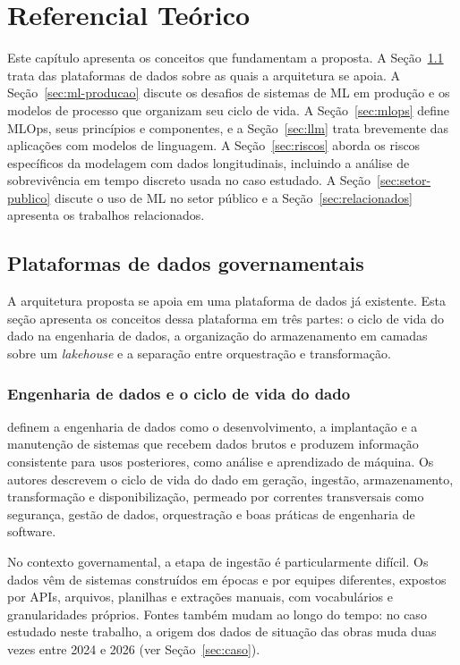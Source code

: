 \chapter[Referencial Teórico]{Referencial Teórico}
\label{cap:referencial}

Este capítulo apresenta os conceitos que fundamentam a proposta. A Seção~\ref{sec:plataformas} trata das plataformas de dados sobre as quais a arquitetura se apoia. A Seção~\ref{sec:ml-producao} discute os desafios de sistemas de ML em produção e os modelos de processo que organizam seu ciclo de vida. A Seção~\ref{sec:mlops} define MLOps, seus princípios e componentes, e a Seção~\ref{sec:llm} trata brevemente das aplicações com modelos de linguagem. A Seção~\ref{sec:riscos} aborda os riscos específicos da modelagem com dados longitudinais, incluindo a análise de sobrevivência em tempo discreto usada no caso estudado. A Seção~\ref{sec:setor-publico} discute o uso de ML no setor público e a Seção~\ref{sec:relacionados} apresenta os trabalhos relacionados.

\section{Plataformas de dados governamentais}
\label{sec:plataformas}

A arquitetura proposta se apoia em uma plataforma de dados já existente. Esta seção apresenta os conceitos dessa plataforma em três partes: o ciclo de vida do dado na engenharia de dados, a organização do armazenamento em camadas sobre um \textit{lakehouse} e a separação entre orquestração e transformação.

\subsection{Engenharia de dados e o ciclo de vida do dado}

 definem a engenharia de dados como o desenvolvimento, a implantação e a manutenção de sistemas que recebem dados brutos e produzem informação consistente para usos posteriores, como análise e aprendizado de máquina. Os autores descrevem o ciclo de vida do dado em geração, ingestão, armazenamento, transformação e disponibilização, permeado por correntes transversais como segurança, gestão de dados, orquestração e boas práticas de engenharia de software.

No contexto governamental, a etapa de ingestão é particularmente difícil. Os dados vêm de sistemas construídos em épocas e por equipes diferentes, expostos por APIs, arquivos, planilhas e extrações manuais, com vocabulários e granularidades próprios. Fontes também mudam ao longo do tempo: no caso estudado neste trabalho, a origem dos dados de situação das obras muda duas vezes entre 2024 e 2026 (ver Seção~\ref{sec:caso}).

